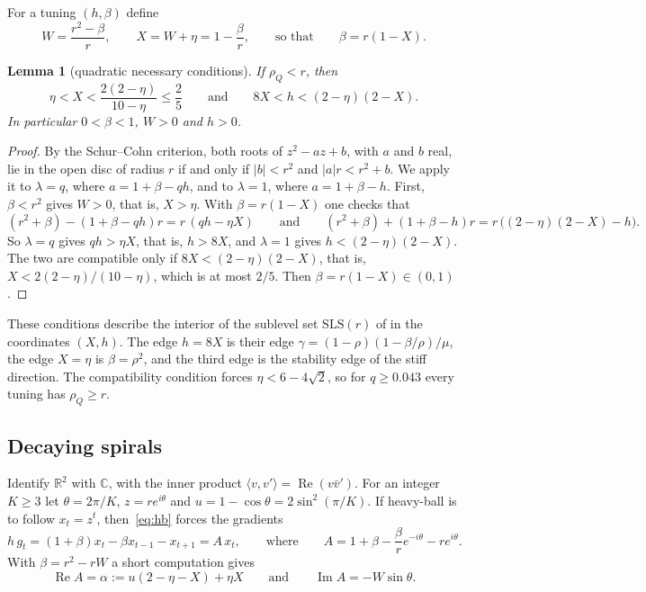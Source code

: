 \documentclass[11pt, a4paper]{article}
\newtheorem{lemma}{Lemma}
\theoremstyle{definition}
\newcommand{\R}{\mathbb{R}}
\newcommand{\C}{\mathbb{C}}
\newcommand{\re}{\operatorname{Re}}
\newcommand{\im}{\operatorname{Im}}
\begin{document}
For a tuning $(h,\beta)$ define
\begin{equation}
  W=\frac{r^2-\beta}{r},\qquad X=W+\eta=1-\frac\beta r,\qquad\text{so that}\qquad\beta=r(1-X).
  \label{eq:WX}
\end{equation}

\begin{lemma}[quadratic necessary conditions]
  \label{lem:jury}
  If $\rho_Q<r$, then
  \[
    \eta<X<\frac{2(2-\eta)}{10-\eta}\le\frac25\qquad\text{and}\qquad 8X<h<(2-\eta)(2-X).
  \]
  In particular $0<\beta<1$, $W>0$ and $h>0$.
\end{lemma}

\begin{proof}
  By the Schur--Cohn criterion, both roots of $z^2-az+b$, with $a$ and $b$ real, lie in the open disc of radius $r$ if
  and only if $|b|<r^2$ and $|a|r<r^2+b$. We apply it to $\lambda=q$, where $a=1+\beta-qh$, and to $\lambda=1$, where
  $a=1+\beta-h$. First, $\beta<r^2$ gives $W>0$, that is, $X>\eta$. With $\beta=r(1-X)$ one checks that
  \[
    (r^2+\beta)-(1+\beta-qh)r=r\,(qh-\eta X)
    \qquad\text{and}\qquad
    (r^2+\beta)+(1+\beta-h)r=r\,\bigl((2-\eta)(2-X)-h\bigr).
  \]
  So $\lambda=q$ gives $qh>\eta X$, that is, $h>8X$, and $\lambda=1$ gives $h<(2-\eta)(2-X)$. The two are compatible only
  if $8X<(2-\eta)(2-X)$, that is, $X<2(2-\eta)/(10-\eta)$, which is at most $2/5$. Then $\beta=r(1-X)\in(0,1)$.
\end{proof}

These conditions describe the interior of the sublevel set $\mathrm{SLS}(r)$ of \citet[Lemma~2.4]{goujaud2025provable}
in the coordinates $(X,h)$. The edge $h=8X$ is their edge $\gamma=(1-\rho)(1-\beta/\rho)/\mu$, the edge $X=\eta$ is
$\beta=\rho^2$, and the third edge is the stability edge of the stiff direction. The compatibility condition forces
$\eta<6-4\sqrt2$, so for $q\ge0.043$ every tuning has $\rho_Q\ge r$.

\subsection{Decaying spirals}

Identify $\R^2$ with $\C$, with the inner product $\langle v,v'\rangle=\re(v\bar v')$. For an integer $K\ge3$ let
$\theta=2\pi/K$, $z=re^{i\theta}$ and $u=1-\cos\theta=2\sin^2(\pi/K)$. If heavy-ball is to follow $x_t=z^t$,
then~\eqref{eq:hb} forces the gradients
\begin{equation}
  h\,g_t=(1+\beta)x_t-\beta x_{t-1}-x_{t+1}=A\,x_t,\qquad\text{where}\qquad
  A=1+\beta-\frac{\beta}{r}e^{-i\theta}-re^{i\theta}.
  \label{eq:A}
\end{equation}
With $\beta=r^2-rW$ a short computation gives
\begin{equation}
  \re A=\alpha:=u(2-\eta-X)+\eta X\qquad\text{and}\qquad\im A=-W\sin\theta.
  \label{eq:ReA}
\end{equation}
\end{document}
